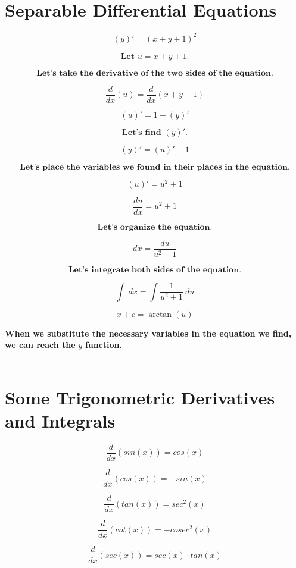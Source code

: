 \documentclass{article}
\begin{document}
\section{Separable Differential Equations}
    \[
    (y)' = (x + y + 1)^2
    \]
    
    \[
    \textbf{Let } u = x + y + 1 \textbf{.}
    \]

    \[
    \textbf{Let's take the derivative of the two sides of the equation.}
    \]
    
    \[
    \frac{d}{dx} (u) = \frac{d}{dx} (x + y + 1)
    \]
    
    \[
    (u)' = 1 + (y)'
    \]

    \[
    \textbf{Let's find } (y)' \textbf{.}
    \]
    
    \[
    (y)' = (u)' - 1
    \]

    \[
    \textbf{Let's place the variables we found in their places in the equation.}
    \]
    
    \[
    (u)' = u^2 + 1
    \]
    
    \[
    \frac{du}{dx} = u^2 + 1
    \]

    \[
    \textbf{Let's organize the equation.}
    \]
    
    \[
    dx = \frac{du}{u^2 + 1}
    \]

    \[
    \textbf{Let's integrate both sides of the equation.}
    \]
    
    \[
    \int \: dx = \int \frac{1}{u^2 + 1} \: du
    \]
    
    \[
    x + c = \arctan(u)
    \]

    \textbf{When we substitute the necessary variables in the equation we find, we can reach the } $y$ \textbf{ function.}
\\~\\

\section{Some Trigonometric Derivatives and Integrals}
    \[
    \frac{d}{dx} \left(sin(x)\right) = cos(x)
    \]

    \[
    \frac{d}{dx} \left(cos(x)\right) = -sin(x)
    \]

    \[
    \frac{d}{dx} \left(tan(x)\right) = sec^2(x)
    \]
    
    \[
    \frac{d}{dx} \left(cot(x)\right) = -cosec^2(x)
    \]
    
    \[
    \frac{d}{dx} \left(sec(x)\right) = sec(x) \cdot tan(x)
    \]
    
\end{document}
